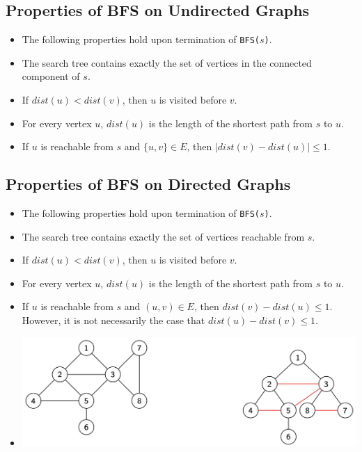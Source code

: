 \subsection{Properties of BFS on Undirected Graphs}
\begin{itemize}
    \item The following properties hold upon termination of \texttt{BFS($s$)}.
    \item The search tree contains exactly the set of vertices in the connected component of $s$.
    \item If $dist(u) < dist(v)$, then $u$ is visited before $v$.
    \item For every vertex $u$, $dist(u)$ is the length of the shortest path from $s$ to $u$.
    \item If $u$ is reachable from $s$ and $\{ u, v \} \in E$, then $\left|dist(v) - dist(u)\right| \leq 1$.
\end{itemize}

\subsection{Properties of BFS on Directed Graphs}
\begin{itemize}
    \item The following properties hold upon termination of \texttt{BFS($s$)}.
    \item The search tree contains exactly the set of vertices reachable from $s$.
    \item If $dist(u) < dist(v)$, then $u$ is visited before $v$.
    \item For every vertex $u$, $dist(u)$ is the length of the shortest path from $s$ to $u$.
    \item If $u$ is reachable from $s$ and $(u, v) \in E$, then $dist(v) - dist(u) \leq 1$. However, it is not necessarily the case that $dist(u) - dist(v) \leq 1$.
    \item[] \includegraphics[width=\textwidth]{lecture18/images/bfs-undirected--layers-example.jpg}
\end{itemize}

